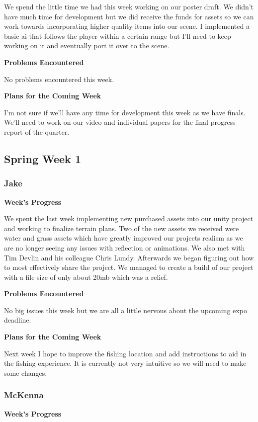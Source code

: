 \documentclass[10pt,journal,compsoc,onecolumn, draftclsnofoot]{IEEEtran}
\begin{document}
We spend the little time we had this week working on our poster draft. We didn't have much time for development but we did receive the funds for assets so we can work towards incorporating higher quality items into our scene. I implemented a basic ai that follows the player within a certain range but I'll need to keep working on it and eventually port it over to the scene.

\noindent \textbf{Problems Encountered}

No problems encountered this week.

\noindent \textbf{Plans for the Coming Week}

I'm not sure if we'll have any time for development this week as we have finals. We'll need to work on our video and individual papers for the final progress report of the quarter.

\subsection{Spring Week 1}
\subsubsection{Jake}
\noindent \textbf{Week's Progress}

We spent the last week implementing new purchased assets into our unity project and working to finalize terrain plans. Two of the new assets we received were water and grass assets which have greatly improved our projects realism as we are no longer seeing any issues with reflection or animations. We also met with Tim Devlin and his colleague Chris Lundy. Afterwards we began figuring out how to most effectively share the project. We managed to create a build of our project with a file size of only about 20mb which was a relief.

\noindent \textbf{Problems Encountered}

No big issues this week but we are all a little nervous about the upcoming expo deadline.

\noindent \textbf{Plans for the Coming Week}

Next week I hope to improve the fishing location and add instructions to aid in the fishing experience. It is currently not very intuitive so we will need to make some changes.

\subsubsection{McKenna}
\noindent \textbf{Week's Progress}
\end{document}
